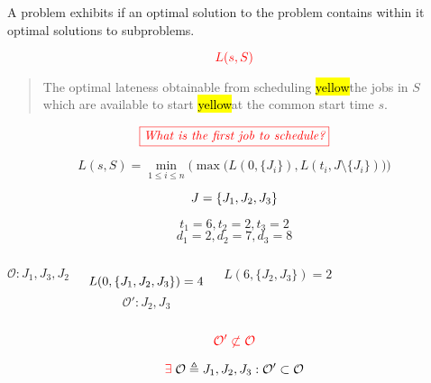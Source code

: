 \begin{frame}{}
  \begin{theorem}
    A problem exhibits \emph{} if
    an optimal solution to the problem contains within it optimal solutions to subproblems.
  \end{theorem}

  \pause
  \[
    \textcolor{red}{L(s, S)}
  \]

  \begin{quote}
    \centering
    {The optimal lateness obtainable from scheduling \hl{yellow}{the jobs in $S$}} \\[6pt]
    {which are available to start \hl{yellow}{at the common start time $s$}}. 
  \end{quote}

  \pause
  \[
    \textcolor{red}{\fbox{\it What is the first job to schedule?}}
  \]

  \[
    L(s, S) = \min_{1 \le i \le n} \Big(\max\big(L(0, \{J_i\}), L(t_i, J \setminus \{J_i\})\big)\Big)
  \]
\end{frame}

\begin{frame}{}
  \[
    J = \left\{J_1, J_2, J_3\right\}
  \]

  \[
    t_1 = 6, t_2 = 2, t_3 = 2
  \]
  \[
    d_1 = 2, d_2 = 7, d_3 = 8
  \]

  \pause
  \vspace{0.30cm}
  \begin{columns}
      \[
	\mathcal{O}: J_1, J_3, J_2
      \]

      \[
	L(0, \left\{J_1, J_2, J_3\right\}) = 4
      \]
      \pause
      \[
	\mathcal{O'}: J_2, J_3
      \]

      \[
	L(6, \{J_2, J_3\}) = 2
      \]
  \end{columns}

  \pause
  \vspace{0.40cm}
  \[
    \textcolor{red}{\mathcal{O'} \not\subset \mathcal{O}}
  \]

  \pause
  \[
    \textcolor{red}{\exists}\; \mathcal{O} \triangleq J_1, J_2, J_3: \mathcal{O'} \subset \mathcal{O}
  \]
\end{frame}

